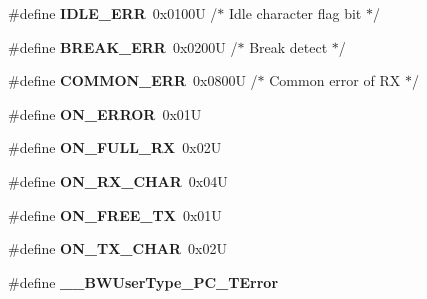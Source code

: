 \begin{DoxyCompactItemize}
\item 
\hypertarget{group___p_c__module_ga4584e89e739c19496724ba117e62aed9}{\#define {\bfseries I\-D\-L\-E\-\_\-\-E\-R\-R}~0x0100\-U       /$\ast$ Idle character flag bit   $\ast$/}\label{group___p_c__module_ga4584e89e739c19496724ba117e62aed9}

\item 
\hypertarget{group___p_c__module_ga0cb4d61ee3347eb62142ca0eb1d02a53}{\#define {\bfseries B\-R\-E\-A\-K\-\_\-\-E\-R\-R}~0x0200\-U       /$\ast$ Break detect              $\ast$/}\label{group___p_c__module_ga0cb4d61ee3347eb62142ca0eb1d02a53}

\item 
\hypertarget{group___p_c__module_ga86e7d2a6a6227d9fbb84d459454c2359}{\#define {\bfseries C\-O\-M\-M\-O\-N\-\_\-\-E\-R\-R}~0x0800\-U       /$\ast$ Common error of R\-X       $\ast$/}\label{group___p_c__module_ga86e7d2a6a6227d9fbb84d459454c2359}

\item 
\hypertarget{group___p_c__module_gab5034f048fef6a41e7901a4e34368f3d}{\#define {\bfseries O\-N\-\_\-\-E\-R\-R\-O\-R}~0x01\-U}\label{group___p_c__module_gab5034f048fef6a41e7901a4e34368f3d}

\item 
\hypertarget{group___p_c__module_ga2cf6b6a2b8c83f7d1d7e6134c6bd9a4a}{\#define {\bfseries O\-N\-\_\-\-F\-U\-L\-L\-\_\-\-R\-X}~0x02\-U}\label{group___p_c__module_ga2cf6b6a2b8c83f7d1d7e6134c6bd9a4a}

\item 
\hypertarget{group___p_c__module_gad07f43952e300ba1e45521ce777c09d4}{\#define {\bfseries O\-N\-\_\-\-R\-X\-\_\-\-C\-H\-A\-R}~0x04\-U}\label{group___p_c__module_gad07f43952e300ba1e45521ce777c09d4}

\item 
\hypertarget{group___p_c__module_ga71d35387335972e4f6ae07ecccf27724}{\#define {\bfseries O\-N\-\_\-\-F\-R\-E\-E\-\_\-\-T\-X}~0x01\-U}\label{group___p_c__module_ga71d35387335972e4f6ae07ecccf27724}

\item 
\hypertarget{group___p_c__module_gaf02aa8bfc7e9b5338168db9ff9077c0d}{\#define {\bfseries O\-N\-\_\-\-T\-X\-\_\-\-C\-H\-A\-R}~0x02\-U}\label{group___p_c__module_gaf02aa8bfc7e9b5338168db9ff9077c0d}

\item 
\hypertarget{group___p_c__module_ga819fa5a0a5856e3feda1d70290ebdc3a}{\#define {\bfseries \-\_\-\-\_\-\-B\-W\-User\-Type\-\_\-\-P\-C\-\_\-\-T\-Error}}\label{group___p_c__module_ga819fa5a0a5856e3feda1d70290ebdc3a}


\end{DoxyCompactItemize}
